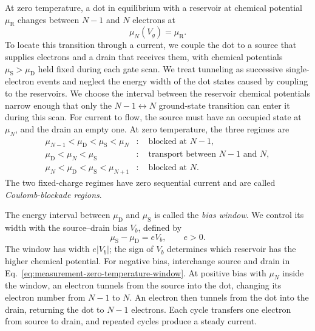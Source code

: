 At zero temperature, a dot in equilibrium with a reservoir at
chemical potential $\mu_{\mathrm R}$ changes between $N-1$ and
$N$ electrons at
\begin{equation}
 \mu_N(V_g)=\mu_{\mathrm R}.
 \label{eq:measurement-transition-target}
\end{equation}
To locate this transition through a current, we couple the dot
to a source that supplies electrons and a drain that receives
them, with chemical potentials $\mu_{\mathrm S}>\mu_{\mathrm D}$
held fixed during each gate scan.
We treat tunneling as successive single-electron events and
neglect the energy width of the dot states caused by coupling to
the reservoirs. We choose the interval between the reservoir
chemical potentials narrow enough that only the $N-1\leftrightarrow N$
ground-state transition can enter it during this scan. For current
to flow, the source must have an occupied state at $\mu_N$, and
the drain an empty one. At zero temperature, the three regimes are
\begin{equation}
 \begin{aligned}
  \mu_{N-1}<\mu_{\mathrm D}<\mu_{\mathrm S}<\mu_N
   &:\quad \text{blocked at }N-1,\\
  \mu_{\mathrm D}<\mu_N<\mu_{\mathrm S}
   &:\quad \text{transport between }N-1\text{ and }N,\\
  \mu_N<\mu_{\mathrm D}<\mu_{\mathrm S}<\mu_{N+1}
   &:\quad \text{blocked at }N.
 \end{aligned}
 \label{eq:measurement-zero-temperature-window}
\end{equation}
The two fixed-charge regimes have zero sequential current and are
called \emph{Coulomb-blockade regions}.

The energy interval between $\mu_{\mathrm D}$ and $\mu_{\mathrm S}$
is called the \emph{bias window}. We control its width with the
source--drain bias $V_b$, defined by
\begin{equation}
 \mu_{\mathrm S}-\mu_{\mathrm D}=eV_b,\qquad e>0.
 \label{eq:measurement-bias-definition}
\end{equation}
The window has width $e|V_b|$; the sign of $V_b$ determines which
reservoir has the higher chemical potential. For negative bias,
interchange source and drain in
Eq.~\eqref{eq:measurement-zero-temperature-window}.
At positive bias with $\mu_N$ inside the window,
an electron tunnels from the source into the dot, changing its
electron number from $N-1$ to $N$. An electron then tunnels from
the dot into the drain, returning the dot to $N-1$ electrons.
Each cycle transfers one electron from source to drain, and
repeated cycles produce a steady current.


